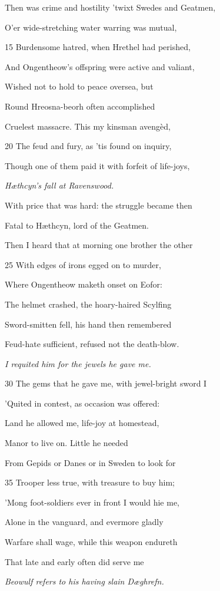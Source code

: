 Then was crime and hostility ’twixt Swedes and Geatmen,

O’er wide-stretching water warring was mutual,

15
Burdensome hatred, when Hrethel had perished,

And Ongentheow’s offspring were active and valiant,

Wished not to hold to peace oversea, but

Round Hreosna-beorh often accomplished

Cruelest massacre. This my kinsman avengèd,

20
The feud and fury, as ’tis found on inquiry,

Though one of them paid it with forfeit of life-joys,

\emph{Hæthcyn’s fall at
Ravenswood.}

With price that was hard: the struggle became then

Fatal to Hæthcyn, lord of the Geatmen.

Then I heard that at morning one brother the other

25
With edges of irons egged on to murder,

Where Ongentheow maketh onset on Eofor:

The helmet crashed, the hoary-haired Scylfing

Sword-smitten fell, his hand then remembered

Feud-hate sufficient, refused not the death-blow.

\emph{I requited him for
the jewels he gave
me.}

30
The gems that he gave me, with jewel-bright sword I

’Quited in contest, as occasion was offered:

Land he allowed me, life-joy at homestead,

Manor to live on. Little he needed

From Gepids or Danes or in Sweden to look for

35
Trooper less true, with treasure to buy him;

’Mong foot-soldiers ever in front I would hie me,

Alone in the vanguard, and evermore gladly

Warfare shall wage, while this weapon endureth

That late and early often did serve me

\emph{Beowulf refers to
his having slain
Dæghrefn.}

